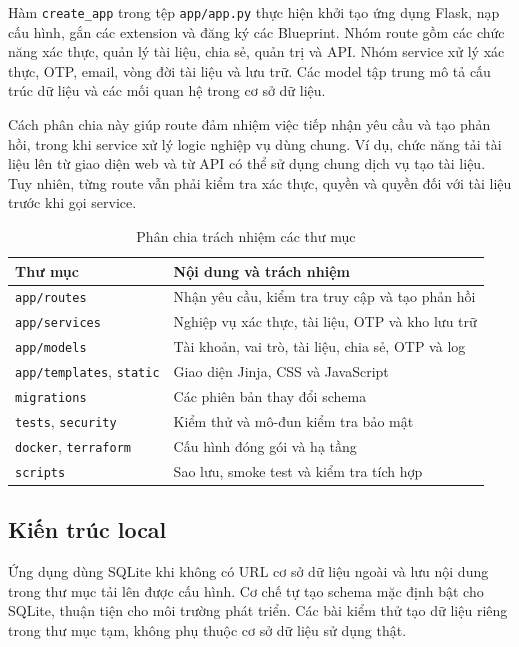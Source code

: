Hàm \texttt{create\_app} trong tệp \texttt{app/app.py}
thực hiện khởi tạo ứng dụng Flask, nạp cấu hình, gắn các
extension và đăng ký các Blueprint. Nhóm route gồm các
chức năng xác thực, quản lý tài liệu, chia sẻ, quản trị
và API. Nhóm service xử lý xác thực, OTP, email, vòng đời
tài liệu và lưu trữ. Các model tập trung mô tả cấu trúc
dữ liệu và các mối quan hệ trong cơ sở dữ liệu.

Cách phân chia này giúp route đảm nhiệm việc tiếp nhận yêu
cầu và tạo phản hồi, trong khi service xử lý logic nghiệp
vụ dùng chung. Ví dụ, chức năng tải tài liệu lên từ giao
diện web và từ API có thể sử dụng chung dịch vụ tạo tài
liệu. Tuy nhiên, từng route vẫn phải kiểm tra xác thực,
quyền và quyền đối với tài liệu trước khi gọi service.
\begin{table}[htbp]\centering\small
\caption{Phân chia trách nhiệm các thư mục}
\begin{tabularx}{\textwidth}{P{3.7cm}X}\toprule
\textbf{Thư mục}&\textbf{Nội dung và trách nhiệm}\\\midrule
\texttt{app/routes} & Nhận yêu cầu, kiểm tra truy cập và tạo phản hồi\\
\texttt{app/services} & Nghiệp vụ xác thực, tài liệu, OTP và kho lưu trữ\\
\texttt{app/models} & Tài khoản, vai trò, tài liệu, chia sẻ, OTP và log\\
\texttt{app/templates}, \texttt{static} & Giao diện Jinja, CSS và JavaScript\\
\texttt{migrations} & Các phiên bản thay đổi schema\\
\texttt{tests}, \texttt{security} & Kiểm thử và mô-đun kiểm tra bảo mật\\
\texttt{docker}, \texttt{terraform} & Cấu hình đóng gói và hạ tầng\\
\texttt{scripts} & Sao lưu, smoke test và kiểm tra tích hợp\\\bottomrule
\end{tabularx}\end{table}
\subsection{Kiến trúc local}
Ứng dụng dùng SQLite khi không có URL cơ sở dữ liệu ngoài và lưu nội dung trong thư mục tải lên được cấu hình. Cơ chế tự tạo schema mặc định bật cho SQLite, thuận tiện cho môi trường phát triển. Các bài kiểm thử tạo dữ liệu riêng trong thư mục tạm, không phụ thuộc cơ sở dữ liệu sử dụng thật.

